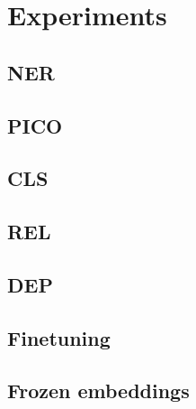 \chapter{Experiments}
\section{NER}
\section{PICO}
\section{CLS}
\section{REL}
\section{DEP}
\section{Finetuning}
\section{Frozen embeddings}
